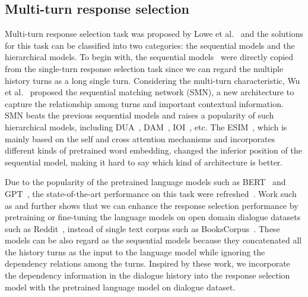 


\subsection{Multi-turn response selection}
\label{sec:mtrs}
Multi-turn response selection task was proposed by Lowe et al.~ and the solutions for this task can be classified into two categories: the sequential models and the hierarchical models. To begin with, the sequential models~\cite{LowePSP15} were directly copied from the single-turn response selection task since we can regard the multiple history turns as a long single turn.  Considering the multi-turn characteristic, Wu et al.~ proposed the sequential matching network (SMN), a new architecture to capture the relationship among turns and important contextual information. SMN beats the previous sequential models and raises a popularity of such hierarchical models, including DUA~\cite{ZhangLZZL18}, DAM~\cite{WuLCZDYZL18}, IOI~\cite{TaoWXHZY19}, etc. The ESIM~\cite{abs-1802-02614}, which is mainly based on the self and cross attention mechanisms and incorporates different kinds of pretrained word embedding, changed the inferior position of the sequential model, making it hard to say which kind of architecture is better.

Due to the popularity of the pretrained language models such as BERT~\cite{DevlinCLT19} and GPT~\cite{radford2018improving}, the state-of-the-art performance on this task were refreshed~\cite{vig2019comparison}. Work such as \cite{abs-1908-04812} and \cite{humeau2019poly} further shows that we can enhance the response selection performance by pretraining or fine-tuning the language models on open domain dialogue datasets such as Reddit~\cite{abs-1904-06472}, instead of single text corpus such as BooksCorpus~\cite{ZhuKZSUTF15}. These models can be also regard as the sequential models because they concatenated all the history turns as the input to the language model while ignoring the dependency relations among the turns. Inspired by these work, we incorporate the dependency information in the dialogue history into the response selection model with the pretrained language model on dialogue dataset.



